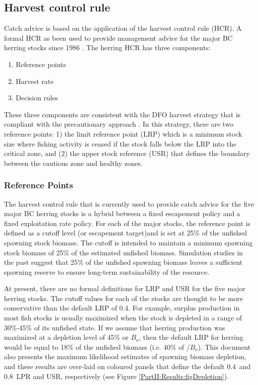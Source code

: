 	\subsection{Harvest control rule}
Catch advice is based on the application of the harvest control rule (HCR). A formal HCR as been used to provide management advice for the major BC herring stocks since 1986 \citep{stocker1993recent}. The herring HCR has three components:
\begin{enumerate}
\item Reference points
\item Harvest rate
\item Decision rules
\end{enumerate}

These three components are consistent with the DFO harvest strategy that is compliant with the precautionary approach \citep{dfo2006}.  In this strategy, there are two reference points: 1) the limit reference point (LRP) which is a minimum stock size where fishing activity is ceased if the stock falls below the LRP into the critical zone, and (2) the upper stock reference (USR) that defines the boundary between the cautious zone and healthy zones.

\subsubsection{Reference Points} %
\label{ssub:reference_points}
The harvest control rule that is currently used to provide catch advice for the five major BC herring stocks is a hybrid between a fixed escapement policy and a fixed exploitation rate policy.  For each of the major stocks, the reference point is defined as a cutoff level (or escapement target)and is set at 25\% of the unfished spawning stock biomass.  The cutoff is intended to maintain a minimum spawning stock biomass of 25\% of the estimated unfished biomass.  Simulation studies in the past \citep{haist1986stock,hall1988alternative} suggest that 25\% of the unfished spawning biomass leaves a sufficient spawning reserve to ensure long-term sustainability of the resource.

At present, there are no formal definitions for LRP and USR for the five major herring stocks.  The cutoff values for each of the stocks are thought to be more conservative than the default LRP of 0.4\bmsy.  For example, surplus production in most fish stocks is usually maximized when the stock is depleted in a range of 30\%-45\% of its unfished state.  If we assume that herring production was maximized at a depletion level of 45\% or $B_o$, then the default LRP for herring would be equal to 18\% of the unfished biomass (i.e. 40\% of \bmsy/$B_o$).  This document also presents the maximum likelihood estimates of spawning biomass depletion, and these results are over-laid on coloured panels that define the default 0.4\bmsy\ and 0.8\bmsy\ LPR and USR, respectively (see Figure \ref{PartII:Results:figDepletion}).

